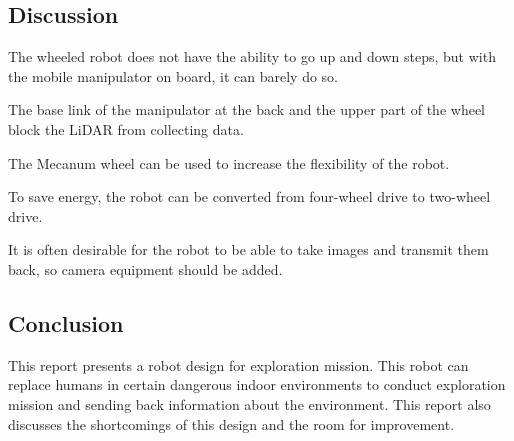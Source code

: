 \subsection{Discussion}

The wheeled robot does not have the ability to go up and down steps, but with the mobile manipulator on board, it can barely do so.

The base link of the manipulator at the back and the upper part of the wheel block the LiDAR from collecting data.

The Mecanum wheel can be used to increase the flexibility of the robot.

To save energy, the robot can be converted from four-wheel drive to two-wheel drive.

It is often desirable for the robot to be able to take images and transmit them back, so camera equipment should be added.

\subsection{Conclusion}

This report presents a robot design for exploration mission. This robot can replace humans in certain dangerous indoor environments to conduct exploration mission and sending back information about the environment. This report also discusses the shortcomings of this design and the room for improvement.

